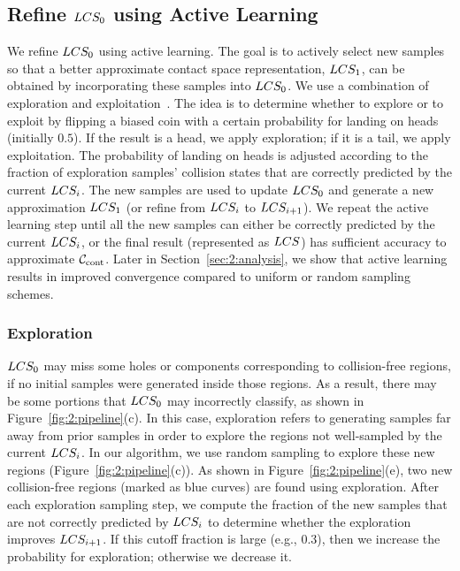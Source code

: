 \subsection{Refine $LCS_0$ using Active Learning}
\label{sec:2:offline:activelearning}
We refine $LCS_0$ using active learning. The
goal is to actively select new samples so that a better
approximate contact space representation, $LCS_1$, can be obtained by incorporating
these samples into $LCS_0$. We use a
combination of exploration and exploitation~\cite{Huang:2010:ALQ}.
The idea is to determine whether to explore
or to exploit by flipping a biased coin with a certain probability for landing on heads
(initially $0.5$). If the result is a head, we apply exploration;
if it is a tail, we apply exploitation. The probability of landing on heads is adjusted
according to the fraction of exploration samples' collision
states that are correctly predicted by the current $LCS_i$. The new
samples are used to update $LCS_0$ and generate a new approximation
$LCS_1$ (or refine from $LCS_i$ to $LCS_{i+1}$). We repeat the active
learning step until all the new samples can either be correctly
predicted by the current $LCS_i$, or the final result (represented
as $LCS$) has sufficient accuracy to approximate $\mathcal C_\text{cont}$. Later in Section~\ref{sec:2:analysis}, we show that active learning results in improved convergence compared to uniform or random sampling schemes.


\subsubsection{Exploration}
$LCS_0$ may miss some holes or components corresponding to collision-free regions, if no initial samples were generated inside those regions. As a result, there may be some portions that $LCS_0$ may incorrectly classify, as shown in Figure~\ref{fig:2:pipeline}(c). In this case,
exploration refers to generating samples far away from prior
samples in order to explore the regions not well-sampled by the
current $LCS_i$. In our algorithm, we use random sampling to
explore these new regions (Figure~\ref{fig:2:pipeline}(c)). As
shown in Figure~\ref{fig:2:pipeline}(e), two new collision-free
regions (marked as blue curves) are found using exploration. After
each exploration sampling step, we compute the fraction of the new
samples that are not correctly predicted by $LCS_i$ to determine whether the exploration improves $LCS_{i+1}$.
If this cutoff fraction is large (e.g., $0.3$), then we increase the probability for exploration; otherwise we
decrease it.


